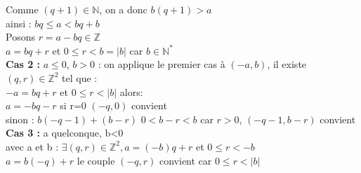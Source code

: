 \documentclass{article}
\begin{document}
Comme $(q+1) \in \mathbb{N}$, on a donc $b(q+1)>a$ \\ 
ainsi : $bq \leq a < bq+b$ \\
Posons $r=a-bq \in \mathbb{Z}$ \\ 
$a=bq +r$ et $ 0 \leq r <b=|b|$ car $b \in \mathbb{N}^\ast$ \\ 
{\bf Cas 2 :} $a \leq 0$, $b>0$ : 
on applique le premier cas à $(-a,b)$, il existe $(q,r) \in \mathbb{Z}^2$ tel que : \\ 
$-a=bq+r$ et $0 \leq r <|b|$ alors: \\ 
$a=-bq-r$ si r=0 $(-q,0)$ convient \\ 
sinon : $b(-q-1)+(b-r)$ $0< b-r <b$ car $r>0$, $(-q-1,b-r)$ convient \\ 
{\bf Cas 3 :} a quelconque, b<0 \\ 
avec a et b : $\exists(q,r) \in \mathbb{Z}^2,a=(-b)q+r$ et $0 \leq r <-b$ \\ 
$a=b(-q)+r$ le couple $(-q,r)$ convient car $0 \leq r < |b|$\\
\end{document}
